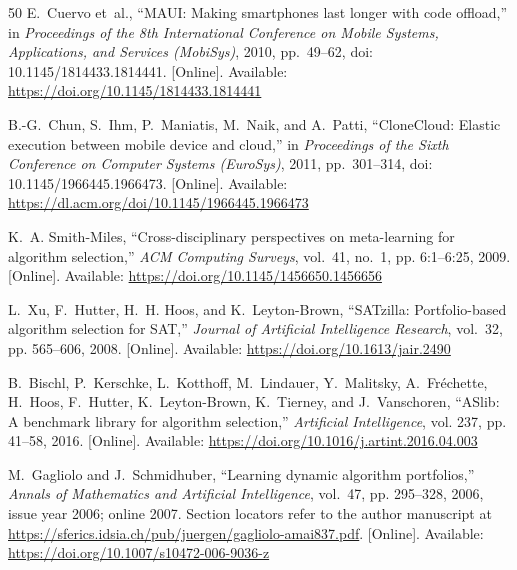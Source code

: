 \documentclass[14pt,a4paper,oneside]{extreport}
\begin{document}
\begin{thebibliography}{50}
E.~Cuervo et~al., ``MAUI: Making smartphones last longer with code offload,'' in
\emph{Proceedings of the 8th International Conference on Mobile Systems,
Applications, and Services (MobiSys)}, 2010, pp.~49--62,
doi: 10.1145/1814433.1814441. [Online]. Available:
\url{https://doi.org/10.1145/1814433.1814441}

B.-G.~Chun, S.~Ihm, P.~Maniatis, M.~Naik, and A.~Patti, ``CloneCloud: Elastic
execution between mobile device and cloud,'' in \emph{Proceedings of the Sixth
Conference on Computer Systems (EuroSys)}, 2011, pp.~301--314,
doi: 10.1145/1966445.1966473. [Online]. Available:
\url{https://dl.acm.org/doi/10.1145/1966445.1966473}

\BIBentryALTinterwordspacing
K.~A. Smith-Miles, ``Cross-disciplinary perspectives on meta-learning for
  algorithm selection,'' \emph{ACM Computing Surveys}, vol.~41, no.~1, pp.
  6:1--6:25, 2009. [Online]. Available:
  \url{https://doi.org/10.1145/1456650.1456656}
\BIBentrySTDinterwordspacing

\BIBentryALTinterwordspacing
L.~Xu, F.~Hutter, H.~H. Hoos, and K.~Leyton-Brown, ``{SATzilla}:
  Portfolio-based algorithm selection for {SAT},'' \emph{Journal of Artificial
  Intelligence Research}, vol.~32, pp. 565--606, 2008. [Online]. Available:
  \url{https://doi.org/10.1613/jair.2490}
\BIBentrySTDinterwordspacing

\BIBentryALTinterwordspacing
B.~Bischl, P.~Kerschke, L.~Kotthoff, M.~Lindauer, Y.~Malitsky,
  A.~Fr\'{e}chette, H.~Hoos, F.~Hutter, K.~Leyton-Brown, K.~Tierney, and
  J.~Vanschoren, ``{ASlib}: A benchmark library for algorithm selection,''
  \emph{Artificial Intelligence}, vol. 237, pp. 41--58, 2016. [Online].
  Available: \url{https://doi.org/10.1016/j.artint.2016.04.003}
\BIBentrySTDinterwordspacing

\BIBentryALTinterwordspacing
M.~Gagliolo and J.~Schmidhuber, ``Learning dynamic algorithm portfolios,''
  \emph{Annals of Mathematics and Artificial Intelligence}, vol.~47, pp.
  295--328, 2006, issue year 2006; online 2007. Section locators refer to the
  author manuscript at
  \url{https://sferics.idsia.ch/pub/juergen/gagliolo-amai837.pdf}. [Online].
  Available: \url{https://doi.org/10.1007/s10472-006-9036-z}
\BIBentrySTDinterwordspacing


\end{thebibliography}
\end{document}
